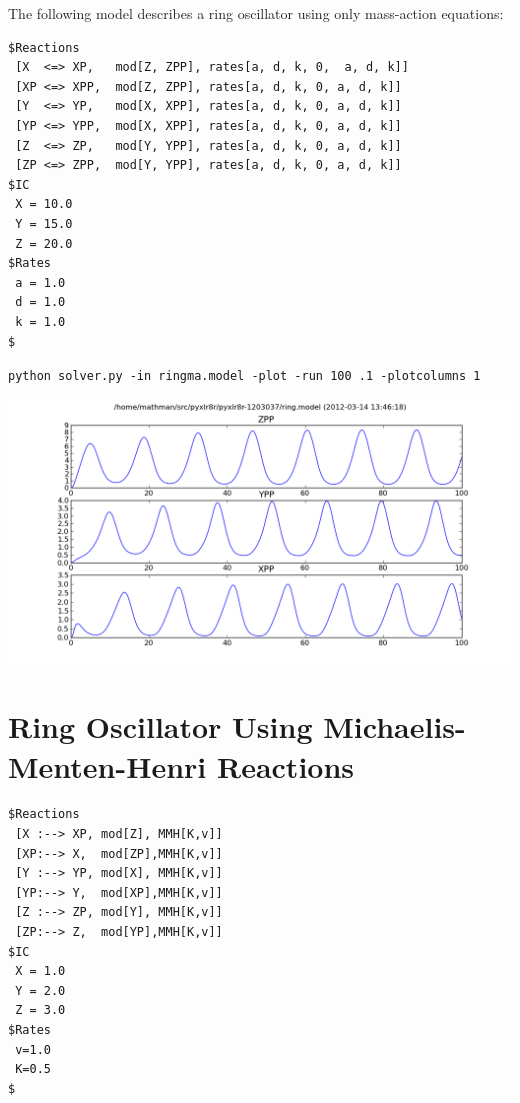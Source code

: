 The following model describes a ring oscillator using only mass-action equations: 
\begin{changemargin}{1.5in}{1in}
\begin{scriptsize}
\begin{Verbatim}[frame=single,xrightmargin=\leftmargin]
$Reactions
 [X  <=> XP,   mod[Z, ZPP], rates[a, d, k, 0,  a, d, k]]
 [XP <=> XPP,  mod[Z, ZPP], rates[a, d, k, 0, a, d, k]]
 [Y  <=> YP,   mod[X, XPP], rates[a, d, k, 0, a, d, k]] 
 [YP <=> YPP,  mod[X, XPP], rates[a, d, k, 0, a, d, k]] 
 [Z  <=> ZP,   mod[Y, YPP], rates[a, d, k, 0, a, d, k]]
 [ZP <=> ZPP,  mod[Y, YPP], rates[a, d, k, 0, a, d, k]]
$IC
 X = 10.0
 Y = 15.0
 Z = 20.0
$Rates
 a = 1.0
 d = 1.0
 k = 1.0
$
\end{Verbatim}
\end{scriptsize}
\end{changemargin}

\begin{center}
{\tt  python solver.py -in ringma.model -plot -run 100 .1 -plotcolumns 1}
\end{center}

\includegraphics[width=\textwidth]{ringma.png}

\pagebreak


\section[Ring Oscillator (MMH)]{Ring Oscillator Using Michaelis-Menten-Henri Reactions}


\begin{changemargin}{1.5in}{1in}
\begin{scriptsize}
\begin{Verbatim}[frame=single,xrightmargin=\leftmargin]
$Reactions
 [X :--> XP, mod[Z], MMH[K,v]]
 [XP:--> X,  mod[ZP],MMH[K,v]]
 [Y :--> YP, mod[X], MMH[K,v]]
 [YP:--> Y,  mod[XP],MMH[K,v]]
 [Z :--> ZP, mod[Y], MMH[K,v]]
 [ZP:--> Z,  mod[YP],MMH[K,v]]
$IC
 X = 1.0
 Y = 2.0
 Z = 3.0
$Rates
 v=1.0
 K=0.5
$
\end{Verbatim}
\end{scriptsize}
\end{changemargin}

